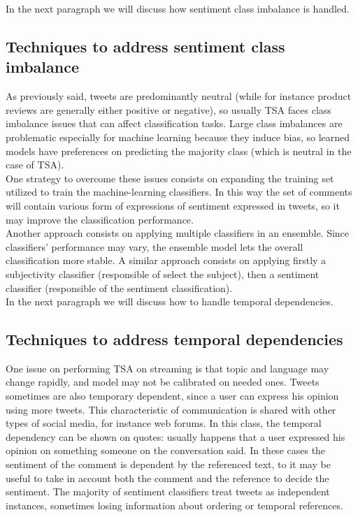 In the next paragraph we will discuss how sentiment class imbalance is handled.\\


\subsection{Techniques to address sentiment class imbalance}
As previously said, tweets are predominantly neutral (while for instance product reviews are generally either positive or negative), so usually \ac{TSA} faces class imbalance issues that can affect classification tasks. Large class imbalances are problematic especially for machine learning because they induce bias, so learned models have preferences on predicting the majority class (which is neutral in the case of \ac{TSA}).\\
One strategy to overcome these issues consists on expanding the training set utilized to train the machine-learning classifiers. In this way the set of comments will contain various form of expressions of sentiment expressed in tweets, so it may improve the classification performance.\\
Another approach consists on applying multiple classifiers in an ensemble. Since classifiers' performance may vary, the ensemble model lets the overall classification more stable. A similar approach consists on applying firstly a subjectivity classifier (responsible of select the subject), then a sentiment classifier (responsible of the sentiment classification).\\

In the next paragraph we will discuss how to handle temporal dependencies.


\subsection{Techniques to address temporal dependencies}
One issue on performing \ac{TSA} on streaming is that topic and language may change rapidly, and model may not be calibrated on needed ones. Tweets sometimes are also temporary dependent, since a user can express his opinion using more tweets. This characteristic of communication is shared with other types of social media, for instance web forums. In this class, the temporal dependency can be shown on quotes: usually happens that a user expressed his opinion on something someone on the conversation said. In these cases the sentiment of the comment is dependent by the referenced text, to it may be useful to take in account both the comment and the reference to decide the sentiment. The majority of sentiment classifiers treat tweets as independent instances, sometimes losing information about ordering or temporal references.



